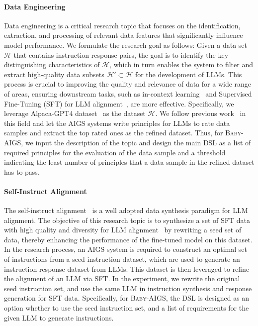 \documentclass{article} %
\newcommand{\AIGS}{AIGS\xspace}
\newcommand{\AIGSSys}{\textsc{Baby-AIGS}\xspace}
\newcommand{\DSL}{\textsc{DSL}\xspace}
\begin{document}
\paragraph{Data Engineering} 
Data engineering is a critical research topic that focuses on the identification, extraction, and processing of relevant data features that significantly influence model performance. We formulate the research goal as follows: Given a data set $\mathcal{H}$ that contains instruction-response pairs, the goal is to identify the key distinguishing characteristics of $\mathcal{H}$, which in turn enables the system to filter and extract high-quality data subsets $\mathcal{H}' \subset \mathcal{H}$ for the development of LLMs. This process is crucial to improving the quality and relevance of data for a wide range of areas, ensuring downstream tasks, such as in-context learning~\citep{brown2020language} and Supervised Fine-Tuning (SFT) for LLM alignment~\citep{NEURIPS2022_b1efde53}, are more effective. Specifically, we leverage Alpaca-GPT4 dataset~\citep{peng2023instruction} as the dataset $\mathcal{H}$. We follow previous work~\citep{deita,chen2024alpagasus,li-etal-2024-one,long-is-more} in this field and let the \AIGS systems write principles for LLMs to rate data samples and extract the top rated ones as the refined dataset. Thus, for \AIGSSys, we input the description of the topic and design the main \DSL as a list of required principles for the evaluation of the data sample and a threshold indicating the least number of principles that a data sample in the refined dataset has to pass. 

\paragraph{Self-Instruct Alignment}
The self-instruct alignment~\citep{wang-etal-2023-self-instruct} is a well adopted data synthesis paradigm for LLM alignment. The objective of this research topic is to synthesize a set of SFT data with high quality and diversity for LLM alignment~\citep{NEURIPS2022_b1efde53} by rewriting a seed set of data, thereby enhancing the performance of the fine-tuned model on this dataset. In the research process, an \AIGS system is required to construct an optimal set of instructions from a seed instruction dataset, which are used to generate an instruction-response dataset from LLMs. This dataset is then leveraged to refine the alignment of an LLM via SFT. In the experiment, we rewrite the original seed instruction set, and use the same LLM in instruction synthesis and response generation for SFT data. Specifically, for \AIGSSys, the \DSL is designed as an option whether to use the seed instruction set, and a list of requirements for the given LLM to generate instructions. 
\end{document}
